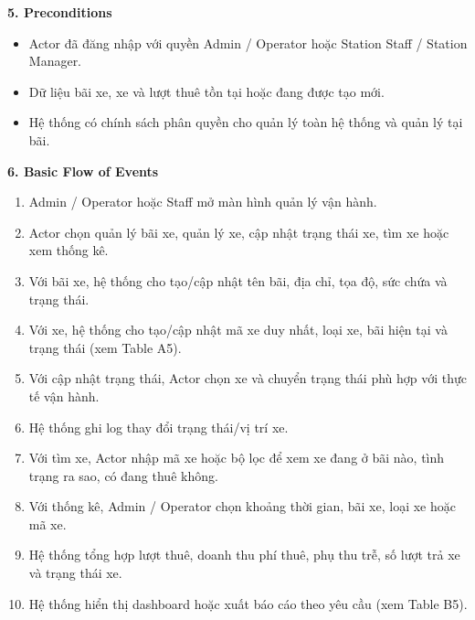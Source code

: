 \textbf{5. Preconditions}
\begin{itemize}
  \item Actor đã đăng nhập với quyền Admin / Operator hoặc Station Staff / Station Manager.
  \item Dữ liệu bãi xe, xe và lượt thuê tồn tại hoặc đang được tạo mới.
  \item Hệ thống có chính sách phân quyền cho quản lý toàn hệ thống và quản lý tại bãi.
\end{itemize}

\textbf{6. Basic Flow of Events}
\begin{enumerate}
  \item Admin / Operator hoặc Staff mở màn hình quản lý vận hành.
  \item Actor chọn quản lý bãi xe, quản lý xe, cập nhật trạng thái xe, tìm xe hoặc xem thống kê.
  \item Với bãi xe, hệ thống cho tạo/cập nhật tên bãi, địa chỉ, tọa độ, sức chứa và trạng thái.
  \item Với xe, hệ thống cho tạo/cập nhật mã xe duy nhất, loại xe, bãi hiện tại và trạng thái (xem Table A5).
  \item Với cập nhật trạng thái, Actor chọn xe và chuyển trạng thái phù hợp với thực tế vận hành.
  \item Hệ thống ghi log thay đổi trạng thái/vị trí xe.
  \item Với tìm xe, Actor nhập mã xe hoặc bộ lọc để xem xe đang ở bãi nào, tình trạng ra sao, có đang thuê không.
  \item Với thống kê, Admin / Operator chọn khoảng thời gian, bãi xe, loại xe hoặc mã xe.
  \item Hệ thống tổng hợp lượt thuê, doanh thu phí thuê, phụ thu trễ, số lượt trả xe và trạng thái xe.
  \item Hệ thống hiển thị dashboard hoặc xuất báo cáo theo yêu cầu (xem Table B5).
\end{enumerate}

